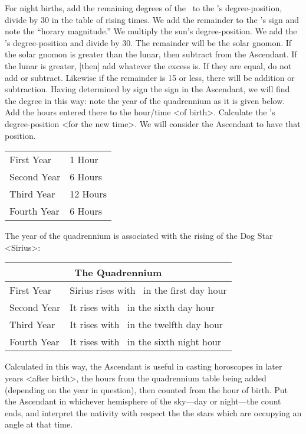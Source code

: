 For night births, add the remaining degrees of the \Moon\, to the \Sun’s degree-position, divide by 30 in the table of rising times. We add the remainder to the \Sun’s sign and note the “horary magnitude.” We multiply the sun’s degree-position. We add the \Sun’s degree-position and divide by 30. The remainder will be the solar gnomon. If the solar gnomon is greater than the lunar, then subtract from the Ascendant.
If the lunar is greater, [then] add whatever the excess is. If they are equal, do not add or subtract. Likewise if the remainder is 15 or less, there will be addition or subtraction.
Having determined by sign the sign in the Ascendant, we will find the degree in this way: note the year of the quadrennium as it is given below. Add the hours entered there to the hour/time <of birth>. Calculate the \Moon’s degree-position <for the new time>. We will consider the Ascendant to have that position.

\renewcommand{\arraystretch}{1.2}
\begin{table}[h!]
\begin{center}
\begin{tabular}{| p{.3\linewidth} | p{.3\linewidth} |}
\hline
First Year & 1 Hour \\
Second Year & 6 Hours \\
Third Year & 12 Hours \\
Fourth Year & 6 Hours \\
\hline
\end{tabular}
\end{center}
\end{table}

The year of the quadrennium is associated with the rising of the Dog Star <Sirius>:

\begin{table}
\begin{center}
\begin{tabularx}{\textwidth}	{| l | X |}
\hline
\multicolumn{2}{|c|}{The Quadrennium} \\
\hline
First Year
	& Sirius rises with \Cancer\, in the first day hour \\
Second Year 
	& It rises with \Libra\, in the sixth day hour \\
Third Year 
	& It rises with \Capricorn\, in the twelfth day hour \\
Fourth Year 
	& It rises with \Aries\, in the sixth night hour \\
\hline	
\end{tabularx}
\end{center}
\end{table}
\mnt[0.2cm]
Calculated in this way, the Ascendant is useful in casting horoscopes in later years <after birth>, the hours from the quadrennium table being added (depending on the year in question), then counted from the hour of birth. Put the Ascendant in whichever hemisphere of the sky—day or night—the count ends, and interpret the nativity with respect the the stars which are occupying an angle at that time.

\newpage